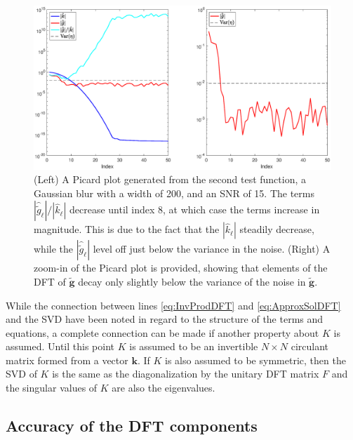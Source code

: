 \documentclass[12pt]{article}
\newcommand{\gnoise}{\widetilde{g}}	%
\newcommand{\gnoiseVec}{\widetilde{\mathbf{g}}}	%
\newcommand{\kVec}{\mathbf{k}}	%
\newcommand{\kMat}{K}	%
\begin{document}
\begin{figure}[htb]
	\centerline{\includegraphics[scale = 0.45]{Figures/PicardPlot1D_F2_S15_W200.eps}}
\caption{(Left) A Picard plot generated from the second test function, a Gaussian blur with a width of 200, and an SNR of 15. The terms $|\widehat{\gnoise}_\ell|/|\widehat{k}_\ell|$ decrease until index 8, at which case the terms increase in magnitude. This is due to the fact that the $|\widehat{k}_\ell|$ steadily decrease, while the $|\widehat{\gnoise}_\ell|$ level off just below the variance in the noise. (Right) A zoom-in of the Picard plot is provided, showing that elements of the DFT of $\gnoiseVec$ decay only slightly below the variance of the noise in $\gnoiseVec$.}
\label{PicardPlot}
\end{figure}

While the connection between lines \eqref{eq:InvProdDFT} and \eqref{eq:ApproxSolDFT} and the SVD have been noted in regard to the structure of the terms and equations, a complete connection can be made if another property about $\kMat$ is assumed. Until this point $\kMat$ is assumed to be an invertible $N \times N$ circulant matrix formed from a vector $\kVec$. If $\kMat$ is also assumed to be symmetric, then the SVD of $\kMat$ is the same as the diagonalization by the unitary DFT matrix $F$ and the singular values of $\kMat$ are also the eigenvalues. \newpage

\subsection{Accuracy of the DFT components} \label{sec:Accuracy of DFT}
\end{document}
